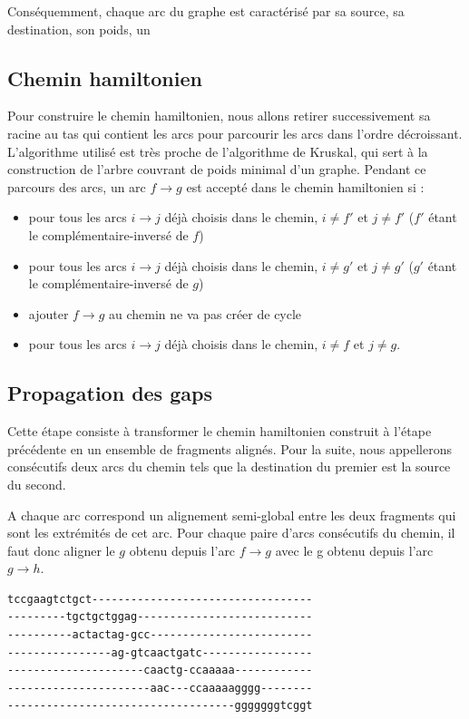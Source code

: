 \documentclass{article}
\begin{document}
Conséquemment, chaque arc du graphe est caractérisé par sa source, sa destination, son poids, un

\subsection{Chemin hamiltonien}

Pour construire le chemin hamiltonien, nous allons retirer successivement sa racine au tas qui contient les arcs pour parcourir les arcs dans l'ordre décroissant. L'algorithme utilisé est très proche de l'algorithme de Kruskal, qui sert à la construction de l'arbre couvrant de poids minimal d'un graphe.
Pendant ce parcours des arcs, un arc $f \to g$ est accepté dans le chemin hamiltonien si :

\begin{itemize}
\item pour tous les arcs $i \to j$ déjà choisis dans le chemin, $i \neq f'$ et $j \neq f'$  ($f'$ étant le complémentaire-inversé de $f$)
\item pour tous les arcs $i \to j$ déjà choisis dans le chemin, $i \neq g'$ et $j \neq g'$  ($g'$ étant le complémentaire-inversé de $g$)
\item ajouter $f \to g$ au chemin ne va pas créer de cycle
\item pour tous les arcs $i \to j$ déjà choisis dans le chemin, $i \neq f$ et $j \neq g$.
\end{itemize}



\subsection{Propagation des gaps}

Cette étape consiste à transformer le chemin hamiltonien construit à l'étape précédente en un ensemble de fragments alignés. Pour la suite, nous appellerons consécutifs deux arcs du chemin tels que la destination du premier est la source du second.

A chaque arc correspond un alignement semi-global entre les deux fragments qui sont les extrémités de cet arc.
Pour chaque paire d'arcs consécutifs du chemin, il faut donc aligner le $g$ obtenu depuis l'arc $f \to g$ avec le g obtenu depuis l'arc $g \to h$.


\begin{verbatim}
tccgaagtctgct----------------------------------
---------tgctgctggag---------------------------
----------actactag-gcc-------------------------
----------------ag-gtcaactgatc-----------------
---------------------caactg-ccaaaaa------------
----------------------aac---ccaaaaagggg--------
-----------------------------------gggggggtcggt
\end{verbatim}
\end{document}
